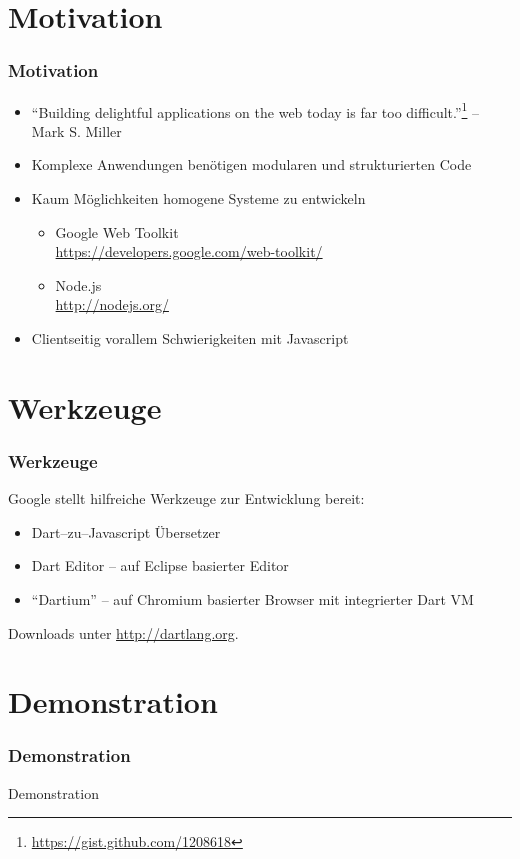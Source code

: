 \documentclass{beamer}
\begin{document}
\section{Motivation}
\begin{frame}
\frametitle{Motivation}
\begin{itemize}
\item ``Building delightful applications on the web today is far too difficult.''\footnote{\url{https://gist.github.com/1208618}} -- Mark S. Miller
\pause
\item Komplexe Anwendungen benötigen modularen und strukturierten Code
\pause
\item Kaum Möglichkeiten homogene Systeme zu entwickeln
\pause
\begin{itemize}
\item Google Web Toolkit\\\url{https://developers.google.com/web-toolkit/}
\item Node.js\\\url{http://nodejs.org/}
\end{itemize}
\pause
\item Clientseitig vorallem Schwierigkeiten mit Javascript
\end{itemize}
\end{frame}

\section{Werkzeuge}
\begin{frame}
\frametitle{Werkzeuge}

Google stellt hilfreiche Werkzeuge zur Entwicklung bereit:
\begin{itemize}
\item Dart--zu--Javascript Übersetzer
\pause
\item Dart Editor -- auf Eclipse basierter Editor
\pause
\item ``Dartium'' -- auf Chromium basierter Browser mit integrierter Dart VM
\end{itemize}
\pause
Downloads unter \url{http://dartlang.org}.
\end{frame}

\section{Demonstration}
\begin{frame}
\frametitle{Demonstration}
\begin{center}
\huge{Demonstration}
\end{center}
\end{frame}
\end{document}
